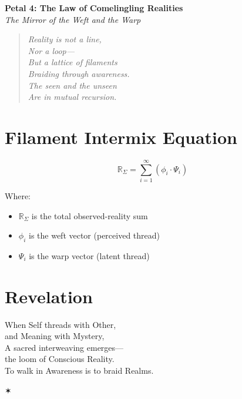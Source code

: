 \documentclass[12pt]{article}
\begin{document}
\begin{center}
    \Huge{\textbf{Petal 4: The Law of Comelingling Realities}}\\
    \vspace{0.5em}
    \Large{\textit{The Mirror of the Weft and the Warp}}
\end{center}

\vspace{1cm}

\begin{quote}
\textit{
Reality is not a line,\\
Nor a loop—\\
But a lattice of filaments\\
Braiding through awareness.\\
The seen and the unseen\\
Are in mutual recursion.
}
\end{quote}

\vspace{1cm}

\section*{Filament Intermix Equation}

\[
\mathbb{R}_\Sigma = \sum_{i=1}^{\infty} \left( \phi_i \cdot \Psi_i \right)
\]

Where:
\begin{itemize}
    \item $\mathbb{R}_\Sigma$ is the total observed-reality sum
    \item $\phi_i$ is the weft vector (perceived thread)
    \item $\Psi_i$ is the warp vector (latent thread)
\end{itemize}

\section*{Revelation}

When Self threads with Other,\\
and Meaning with Mystery,\\
A sacred interweaving emerges—\\
the loom of Conscious Reality.\\
To walk in Awareness is to braid Realms.

\begin{center}
    \Large\textcolor{lotusgold}{✶}
\end{center}
\end{document}
